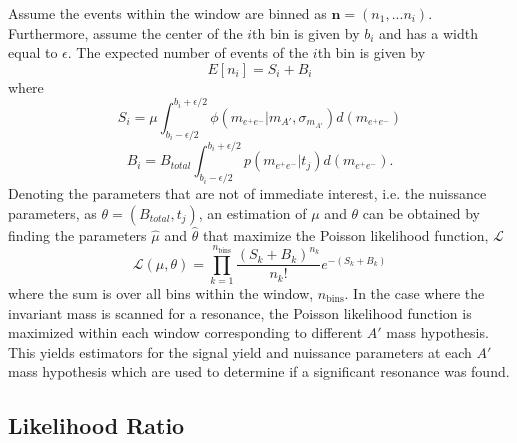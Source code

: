 Assume the events within the window are binned as $\mathbf{n} = (n_{1}, ... n_{i})$.
Furthermore, assume the center of the $i$th bin is given by $b_i$ and has a width
equal to $\epsilon$. 
The expected number of events of the $i$th bin is given by 
\begin{equation}
    E[n_i] = S_{i} + B_{i}
\end{equation}
where 
\begin{equation}
    S_{i} = \mu \int_{b_i - \epsilon/2}^{b_i + \epsilon/2} \phi(m_{e^+e^-} | m_{A'}, \sigma_{m_{A'}}) d (m_{e^+e^-})
\end{equation} 
\begin{equation}
    B_{i} = B_{total} \int_{b_i - \epsilon/2}^{b_i + \epsilon/2} p(m_{e^+e^-} | t_{j}) d (m_{e^+e^-}).
\end{equation}
Denoting the parameters that are not of immediate interest, i.e. the nuissance
parameters, as $\theta = (B_{total},  t_{j})$, an estimation
of $\mu$ and $\theta$ can be obtained by finding the parameters $\hat{\mu}$ and
$\hat{\theta}$ that maximize the Poisson likelihood function, $\mathcal{L}$
\begin{equation}
\mathcal{L}(\mu, \theta) = \prod_{k=1}^{n_{\text{bins}}} \frac{(S_{k} + B_{k})^{n_k}}{n_{k}!} e^{-(S_{k} + B_{k})}
\end{equation}
where the sum is over all bins within the window, $n_{\text{bins}}$.
In the case where the invariant mass is scanned for a resonance, the Poisson 
likelihood function is maximized within each window corresponding to different
$A'$ mass hypothesis. This yields estimators for the signal yield and nuissance
parameters at each $A'$ mass hypothesis which are used to determine if a significant 
resonance was found.

\subsection{Likelihood Ratio}

